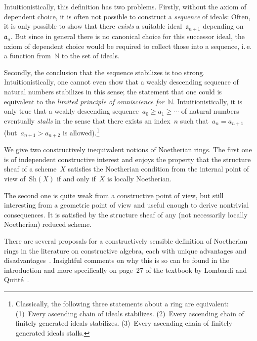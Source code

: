 \documentclass[10pt,reqno,a4paper]{amsbook}
\makeatletter
\theoremstyle{definition}
\theoremstyle{plain}
\theoremstyle{remark}
\newcommand{\NN}{\mathbb{N}}
\newcommand{\aaa}{\mathfrak{a}}
\newcommand{\Sh}{\mathrm{Sh}}
\newcommand{\?}{\,{:}\,}
\renewcommand{\_}{\mathpunct{.}\,}
\newcommand{\ie}{i.\,e.\@\xspace}
\makeatother
\begin{document}
Intuitionistically, this definition has two problems. Firstly, without the
axiom of dependent choice, it is often not possible to construct a
\emph{sequence} of ideals: Often, it is only possible to show that there
\emph{exists} a suitable ideal~$\aaa_{n+1}$ depending on~$\aaa_n$. But since in
general there is no canonical choice for this successor ideal, the axiom of dependent choice
would be required to collect those into a sequence, \ie a function from~$\NN$
to the set of ideals.

Secondly, the conclusion that the sequence stabilizes is too strong.
Intuitionistically, one cannot even show that a weakly descending sequence of
natural numbers stabilizes in this sense; the statement that one could is
equivalent to the \emph{limited principle of omniscience for~$\NN$}.
Intuitionistically, it is only true that a weakly descending sequence~$a_0 \geq
a_1 \geq \cdots$ of natural numbers eventually \emph{stalls} in the sense that
there exists an index~$n$ such that~$a_n = a_{n+1}$ (but~$a_{n+1} > a_{n+2}$ is
allowed).\footnote{Classically, the following three statements about a ring are
equivalent: (1)~Every ascending chain of ideals stabilizes. (2)~Every ascending
chain of finitely generated ideals stabilizes. (3)~Every ascending chain of
finitely generated ideals stalls.}

We give two constructively inequivalent notions of Noetherian rings. The first
one is of independent constructive interest and enjoys the property that the structure sheaf
of a scheme~$X$ satisfies the Noetherian condition from the internal point of
view of~$\Sh(X)$ if and only if~$X$ is locally Noetherian.

The second one is quite weak from a constructive point of view, but still
interesting from a geometric point of view and useful enough to derive
nontrivial consequences. It is satisfied by the structure sheaf of any (not
necessarily locally Noetherian) reduced scheme.

There are several proposals for a constructively sensible definition of
Noetherian rings in the literature on constructive algebra, each with unique
advantages and
disadvantages~\cite{richman:noetherian,mines-richman-ruitenburg:constructive-algebra,perdry:noetherian,perdry:lazy,perdry-schuster:noetherian,tennenbaum:hilbert}.
Insightful comments on why this is so can be found in the introduction and more
specifically on page~27 of the textbook by Lombardi and
Quitté~\cite{lombardi:quitte:constructive-algebra}.
\end{document}
